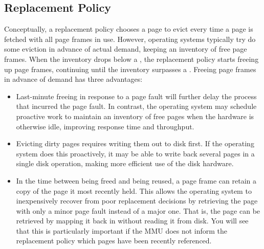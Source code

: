 \subsection{Replacement Policy}

Conceptually, a replacement policy chooses a page to evict every time
a page is fetched with all page frames in use.  However, operating
systems typically try do some eviction in advance of actual demand,
keeping an inventory of free page frames.  When the inventory
drops below a , the replacement policy starts
freeing up page frames, continuing until the inventory surpasses a
.  Freeing page frames in advance of demand has
three advantages:
\begin{itemize}
\item
Last-minute freeing in response to a page fault will further delay the
process that incurred the page fault.  In contrast, the operating
system may schedule proactive work to maintain an inventory of free
pages when the hardware is otherwise idle, improving response time and
throughput.
\item
Evicting dirty pages requires writing them out to disk first.  If the
operating system does this proactively, it may be able to write back
several pages in a single disk operation, making more efficient use of
the disk hardware.
\item
In the time between being freed and being reused, a page frame can
retain a copy of the page it most recently held.  This allows the
operating system to inexpensively recover from poor replacement
decisions by retrieving the page with only a minor page fault instead
of a major one.  That is, the page can be retrieved by mapping it
back in without reading it from
disk.  You will see that this is particularly important if the MMU does
not inform the replacement policy which pages have been recently
referenced.
\end{itemize}

